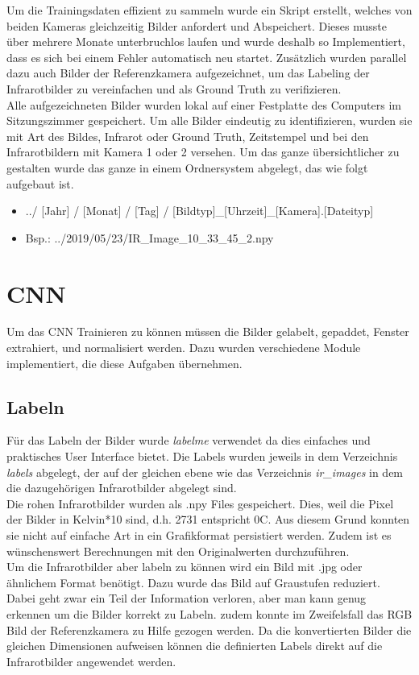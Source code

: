Um die Trainingsdaten effizient zu sammeln wurde ein  Skript erstellt, welches von beiden Kameras gleichzeitig Bilder anfordert und Abspeichert. Dieses musste über mehrere Monate unterbruchlos laufen und wurde deshalb so Implementiert, dass es sich bei einem Fehler automatisch neu startet. Zusätzlich wurden parallel dazu auch Bilder der Referenzkamera aufgezeichnet, um das Labeling der Infrarotbilder zu vereinfachen und als Ground Truth zu verifizieren.\\
Alle aufgezeichneten Bilder wurden lokal auf einer Festplatte des Computers im Sitzungszimmer gespeichert. Um alle Bilder eindeutig zu identifizieren, wurden sie mit Art des Bildes, Infrarot oder Ground Truth, Zeitstempel und bei den Infrarotbildern mit Kamera 1 oder 2 versehen. Um das ganze übersichtlicher zu gestalten wurde das ganze in einem Ordnersystem abgelegt, das wie folgt aufgebaut ist.

\begin{itemize}
	\item ../ [Jahr] / [Monat] / [Tag] / [Bildtyp]\_[Uhrzeit]\_[Kamera].[Dateityp]
	\item Bsp.: ../2019/05/23/IR\_Image\_10\_33\_45\_2.npy
\end{itemize}


\section{CNN}

Um das \gls{CNN} Trainieren zu können müssen die Bilder gelabelt, gepaddet, Fenster extrahiert, und normalisiert werden. Dazu wurden verschiedene Module implementiert, die diese Aufgaben übernehmen.

\subsection{Labeln}
\label{sec:labeling}

Für das Labeln der Bilder wurde \textit{labelme}\parencite{labelme2016} verwendet da dies einfaches und praktisches User Interface bietet. Die Labels wurden jeweils in dem Verzeichnis \textit{labels} abgelegt, der auf der gleichen ebene wie das Verzeichnis \textit{ir\_images} in dem die dazugehörigen Infrarotbilder abgelegt sind.\\
Die rohen Infrarotbilder wurden als .npy \parencite{npyformat} Files gespeichert. Dies, weil die Pixel der Bilder in Kelvin*10 sind, d.h. 2731 entspricht 0\degree C. Aus diesem Grund konnten sie nicht auf einfache Art in ein Grafikformat persistiert werden. Zudem ist es wünschenswert Berechnungen mit den Originalwerten durchzuführen.\\
Um die Infrarotbilder aber labeln zu können wird ein Bild mit .jpg oder ähnlichem Format benötigt. Dazu wurde das Bild auf Graustufen reduziert. Dabei geht zwar ein Teil der Information verloren, aber man kann genug erkennen um die Bilder korrekt zu Labeln. zudem konnte im Zweifelsfall das RGB Bild der Referenzkamera zu Hilfe gezogen werden. Da die konvertierten Bilder die gleichen Dimensionen aufweisen können die definierten Labels direkt auf die Infrarotbilder angewendet werden.

